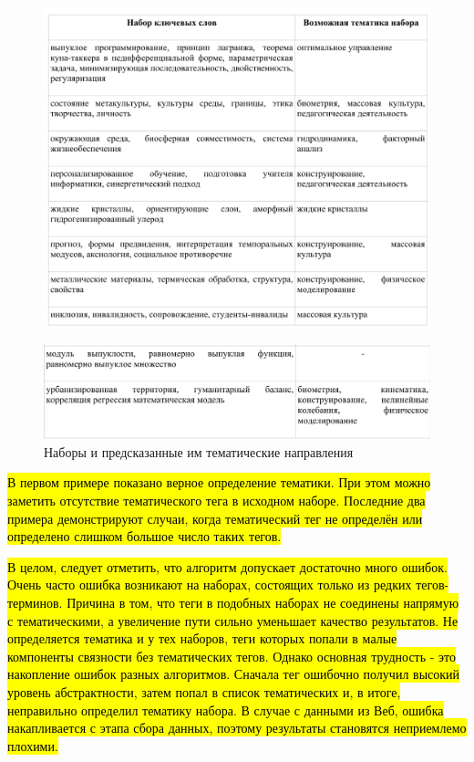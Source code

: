 \begin{figure}[ht]
  \begin{minipage}[ht]{1.0\linewidth}\centering
    \includegraphics[width=1.0\linewidth]{Dissertation/pics/theme_table_1}
  \end{minipage}
  \label{tbl:theme_table_1}
\end{figure}

\begin{figure}[ht]
  \begin{minipage}[ht]{1.0\linewidth}\centering
    \includegraphics[width=1.0\linewidth]{Dissertation/pics/theme_table_2}
    \caption{Наборы и предсказанные им тематические направления}
  \end{minipage}
  \label{tbl:theme_table_2}
\end{figure}

\hl{В первом примере показано верное определение тематики. При этом можно заметить отсутствие тематического тега в исходном наборе. Последние два примера демонстрируют случаи, когда тематический тег не определён или определено слишком большое число таких тегов.}

\hl{В целом, следует отметить, что алгоритм допускает достаточно много ошибок. Очень часто ошибка возникают на наборах, состоящих только из редких тегов-терминов. Причина в том, что теги в подобных наборах не соединены напрямую с тематическими, а увеличение пути сильно уменьшает качество результатов. Не определяется тематика и у тех наборов, теги которых попали в малые компоненты связности без тематических тегов. Однако основная трудность - это накопление ошибок разных алгоритмов. Сначала тег ошибочно получил высокий уровень абстрактности, затем попал в список тематических и, в итоге, неправильно определил тематику набора. В случае с данными из Веб, ошибка накапливается с этапа сбора данных, поэтому результаты становятся неприемлемо плохими.}

